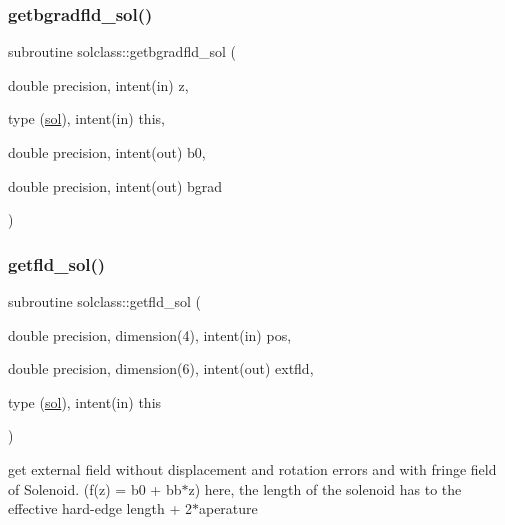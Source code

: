 \mbox{\label{namespacesolclass_ad89ee3db004c00d4f2e128ddbf03ce32}} 
\subsubsection{\texorpdfstring{getbgradfld\_sol()}{getbgradfld\_sol()}}
{\footnotesize\ttfamily subroutine solclass\+::getbgradfld\+\_\+sol (\begin{DoxyParamCaption}\item[{double precision, intent(in)}]{z,  }\item[{type (\mbox{\hyperlink{namespacesolclass_structsolclass_1_1sol}{sol}}), intent(in)}]{this,  }\item[{double precision, intent(out)}]{b0,  }\item[{double precision, intent(out)}]{bgrad }\end{DoxyParamCaption})}

\mbox{\label{namespacesolclass_a7a865f7ab4470f9bff328ed98aacd7c8}} 
\subsubsection{\texorpdfstring{getfld\_sol()}{getfld\_sol()}}
{\footnotesize\ttfamily subroutine solclass\+::getfld\+\_\+sol (\begin{DoxyParamCaption}\item[{double precision, dimension(4), intent(in)}]{pos,  }\item[{double precision, dimension(6), intent(out)}]{extfld,  }\item[{type (\mbox{\hyperlink{namespacesolclass_structsolclass_1_1sol}{sol}}), intent(in)}]{this }\end{DoxyParamCaption})}



get external field without displacement and rotation errors and with fringe field of Solenoid. (f(z) = b0 + bb$\ast$z) here, the length of the solenoid has to the effective hard-\/edge length + 2$\ast$aperature 

